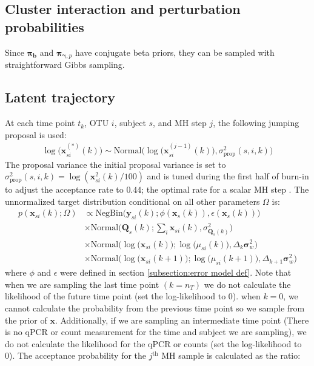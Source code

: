 \documentclass{article}
\newcommand{\Normaldist}{\text{Normal}}
\newcommand{\NegBindist}{\text{NegBin}}
\newcommand{\interact}{\mathbf{b}}
\newcommand{\probinteract}{\mathbf{\pi}_{\interact}}
\newcommand{\pert}{\mathbf{\gamma}}
\newcommand{\probperti}[1]{\mathbf{\pi}_{\pert, #1}}
\newcommand{\pv}{\mathbf{\sigma}_w^2}
\newcommand{\musik}[3]{\mu_{#1 #2}(#3)}
\newcommand{\xsik}[3]{\mathbf{x}_{#1 #2}(#3)}
\newcommand{\xsikexp}[4]{\mathbf{x}^{#4}_{#1 #2}(#3)}
\newcommand{\xsk}[2]{\mathbf{x}_{#1}(#2)}
\newcommand{\countsik}[3]{\mathbf{y}_{#1 #2}(#3)}
\newcommand{\qpcrsk}[2]{\mathbf{Q}_{#1}(#2)}
\newcommand{\varpropsik}[3]{\sigma^2_{\text{prop}}(#1, #2, #3)}
\newcommand{\dt}{\Delta_k}
\newcommand{\dtk}[1]{\Delta_{#1}} %
\begin{document}
\subsection{Cluster interaction and perturbation probabilities}
Since $\probinteract$ and $\probperti{p}$ have conjugate beta priors, they can be sampled with straightforward Gibbs sampling.

\subsection{Latent trajectory}
At each time point $t_k$, OTU $i$, subject $s$, and MH step $j$, the following jumping proposal is used:
\begin{align}
    \log \Big( \xsikexp{s}{i}{k}{(*)} \Big) \sim \Normaldist \Big(
        \log \Big( \xsikexp{s}{i}{k}{(j-1)} \Big), 
        \varpropsik{s}{i}{k} \Big)
\end{align}
The proposal variance the initial proposal variance is set to $\varpropsik{s}{i}{k} = \log ( \xsikexp{s}{i}{k}{2} / 100 )$ and is tuned during the first half of burn-in to adjust the acceptance rate to $0.44$; the optimal rate for a scalar MH step \cite{cite:BDA}. The unnormalized target distribution conditional on all other parameters $\Omega$ is:
\begin{align}
    p(\xsik{s}{i}{k}; \Omega) & \propto
        \NegBindist \Big(
            \countsik{s}{i}{k} ;
            \phi (\xsk{s}{k}),
            \epsilon (\xsk{s}{k}) \Big) \\
        & \times \Normaldist \Big(
            \qpcrsk{s}{k} ;
            \sum_i \xsik{s}{i}{k} ,
            \sigma^2_{\qpcrsk{s}{k}} \Big) \\
        & \times \Normaldist \Big(
            \log \Big( \xsik{s}{i}{k} \Big) ;
            \log \Big( \musik{s}{i}{k} \Big) , 
            \dt \pv \Big) \\
        & \times \Normaldist \Big(
            \log \Big( \xsik{s}{i}{k+1} \Big) ; 
            \log \Big( \musik{s}{i}{k+1} \Big) , 
            \dtk{k+1} \pv \Big)
\end{align}
where $\phi$ and $\epsilon$ were defined in section \ref{subsection:error model def}. Note that when we are sampling the last time point $(k = n_T)$ we do not calculate the likelihood of the future time point (set the log-likelihood to 0). when $k=0$, we cannot calculate the probability from the previous time point so we sample from the prior of $\mathbf{x}$. Additionally, if we are sampling an intermediate time point (There is no qPCR or count measurement for the time and subject we are sampling), we do not calculate the likelihood for the qPCR or counts (set the log-likelihood to 0). The acceptance probability for the $j^{\text{th}}$ MH sample is calculated as the ratio:
\end{document}
